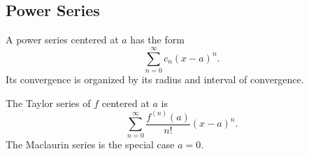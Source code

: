 \subsection*{Power Series}

\begin{definition*}
A power series centered at \(a\) has the form
\[
  \sum_{n=0}^{\infty} c_n(x-a)^n.
\]
Its convergence is organized by its radius and interval of convergence.
\end{definition*}

\begin{definition*}
The Taylor series of \(f\) centered at \(a\) is
\[
  \sum_{n=0}^{\infty}\frac{f^{(n)}(a)}{n!}(x-a)^n.
\]
The Maclaurin series is the special case \(a=0\).
\end{definition*}
